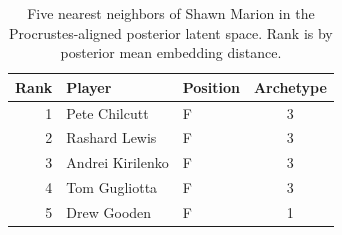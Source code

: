 \begin{table}[htbp]
  \centering\small
  \begin{tabular}{rllc}
    \toprule
    Rank & Player & Position & Archetype \\
    \midrule
    1 & Pete Chilcutt & F & 3 \\
    2 & Rashard Lewis & F & 3 \\
    3 & Andrei Kirilenko & F & 3 \\
    4 & Tom Gugliotta & F & 3 \\
    5 & Drew Gooden & F & 1 \\
    \bottomrule
  \end{tabular}
  \caption{Five nearest neighbors of Shawn Marion in the Procrustes-aligned posterior latent space. Rank is by posterior mean embedding distance.}
  \label{tab:Shawn_Marion_neighbors}
\end{table}

